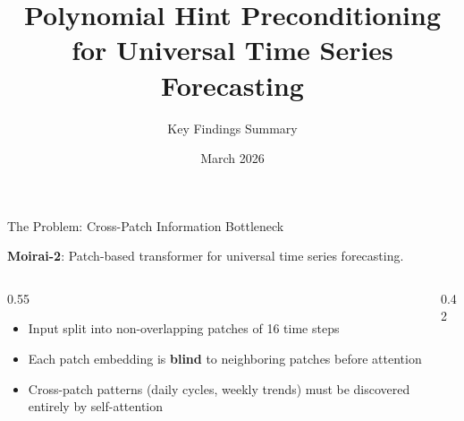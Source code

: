 \documentclass[aspectratio=169,11pt]{beamer}
\title{Polynomial Hint Preconditioning\\for Universal Time Series Forecasting}
\subtitle{Key Findings Summary}
\date{March 2026}
\begin{document}
\begin{frame}
\titlepage
\end{frame}

\begin{frame}{The Problem: Cross-Patch Information Bottleneck}

\textbf{Moirai-2}: Patch-based transformer for universal time series forecasting.

\medskip

\begin{columns}
\begin{column}{0.55\textwidth}
\begin{itemize}
    \item Input split into non-overlapping patches of 16 time steps
    \item Each patch embedding is \textbf{blind} to neighboring patches before attention
    \item Cross-patch patterns (daily cycles, weekly trends) must be discovered entirely by self-attention
\end{itemize}
\end{column}
\begin{column}{0.42\textwidth}
\centering
{}
\end{column}
\end{columns}

\end{frame}
\end{document}
